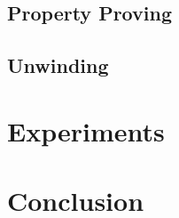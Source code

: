 \documentclass{llncs}
\begin{document}
\subsection{Property Proving}
\label{subsection:property-proving}

\subsection{Unwinding}
\label{subsection:unwinding}


\section{Experiments}
\label{section:experiments}



\section{Conclusion}
\label{section:conclusion}




\end{document}
